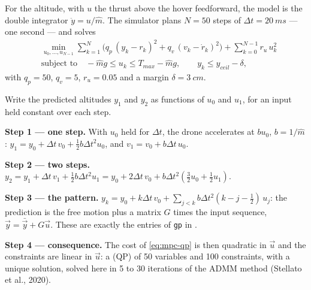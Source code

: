 For the altitude, with $u$ the thrust above the hover feedforward, the model is the double integrator $\ddot y = u/\hat m$. The simulator plans $N = 50$ steps of $\Delta t = \SI{20}{ms}$ — one second — and solves
\begin{equation}\label{eq:mpc-qp}
  \begin{aligned}
  &\min_{u_0, \dots, u_{N-1}} \sum_{k=1}^{N} \Big(q_p\,(y_k - r_k)^2 + q_v\,(v_k - \dot r_k)^2\Big) + \sum_{k=0}^{N-1} r_u\,u_k^2\\
  &\text{subject to}\quad -\hat mg \le u_k \le T_{max} - \hat mg,\qquad y_k \le y_{ceil} - \delta ,
  \end{aligned}
\end{equation}
with $q_p = 50$, $q_v = 5$, $r_u = 0.05$ and a margin $\delta = \SI{3}{cm}$.

\begin{example}
\label{ex:mpc-condense}
Write the predicted altitudes $y_1$ and $y_2$ as functions of $u_0$ and $u_1$, for an input held constant over each step.

\textbf{Step 1 — one step.} With $u_0$ held for $\Delta t$, the drone accelerates at $b u_0$, $b = 1/\hat m$: $y_1 = y_0 + \Delta t\,v_0 + \tfrac12 b\Delta t^2 u_0$, and $v_1 = v_0 + b\Delta t\,u_0$.

\textbf{Step 2 — two steps.} $y_2 = y_1 + \Delta t\,v_1 + \tfrac12 b\Delta t^2 u_1 = y_0 + 2\Delta t\,v_0 + b\Delta t^2(\tfrac32 u_0 + \tfrac12 u_1)$.

\textbf{Step 3 — the pattern.} $y_k = y_0 + k\Delta t\,v_0 + \sum_{j<k} b\Delta t^2(k - j - \tfrac12)\,u_j$: the prediction is the free motion plus a matrix $G$ times the input sequence, $\vec y = \bar{\vec y} + G\vec u$. These are exactly the entries of \texttt{gp} in .

\textbf{Step 4 — consequence.} The cost of \cref{eq:mpc-qp} is then quadratic in $\vec u$ and the constraints are linear in $\vec u$: a  (QP) of 50 variables and 100 constraints, with a unique solution, solved here in 5 to 30 iterations of the ADMM method (Stellato et al., 2020).
\end{example}

